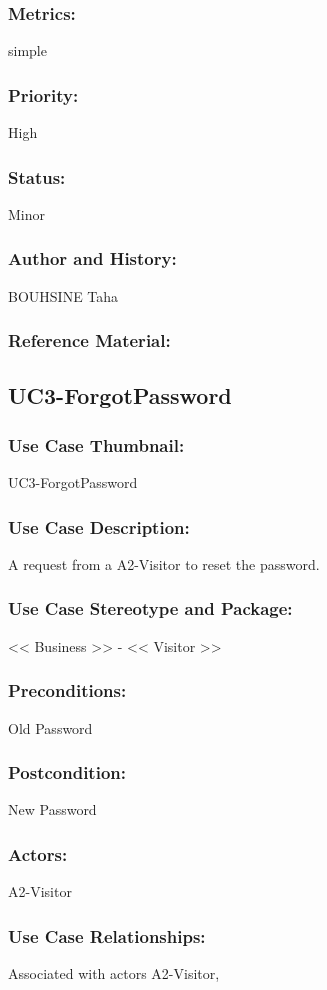 \documentclass[11pt, openany]{report}
\begin{document}
\subsubsection{Metrics:}
simple
\subsubsection{Priority:}
High
\subsubsection{Status:}
Minor
\subsubsection{Author and History:}
BOUHSINE Taha
\subsubsection{Reference Material:}

\subsection{UC3-ForgotPassword}
\label{UC3}
\subsubsection{Use Case Thumbnail:}
UC3-ForgotPassword
\subsubsection{Use Case Description:}
A request from a A2-Visitor to reset the password.
\subsubsection{Use Case Stereotype and Package:}
<< Business >> - << Visitor >>
\subsubsection{Preconditions:}
Old Password
\subsubsection{Postcondition:}
New Password
\subsubsection{Actors:}
A2-Visitor
\subsubsection{Use Case Relationships:}
Associated with actors A2-Visitor,
\end{document}
